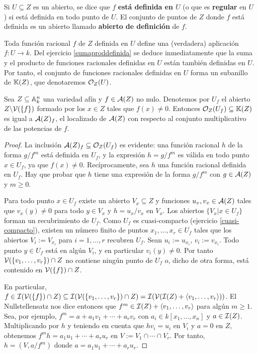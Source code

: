 \documentclass[ACGA.tex]{subfiles}
\begin{document}
 Si $U\subseteq Z$ es un abierto, se dice que $f$ {\bf está definida en $U$} (o que es {\bf regular} en $U$) si está definida en todo punto de $U$. El conjunto de puntos de $Z$ donde $f$ está definida es un abierto llamado {\bf abierto de definición} de $f$. 


Toda función racional $f$ de $Z$ definida en $U$ define una (verdadera) aplicación $f:U\to k$. Del ejercicio \ref{sumaproddefinida} se deduce inmediatamente que la suma y el producto de funciones racionales definidas en $U$ están también definidas en $U$. Por tanto, el conjunto de funciones racionales definidas en $U$ forma un subanillo de $\mathbb{K}(Z)$, que denotaremos ${\mathcal O}_Z(U)$.

\begin{prop}
 Sea $Z\subseteq\mathbb{A}^n_k$ una variedad afín y $f\in{\mathcal A}(Z)$ no nulo. Denotemos por $U_f$ el abierto $Z\backslash \mathcal{V}(\{f\})$ formado por los $x\in Z$ tales que $f(x)\neq 0$. Entonces ${\mathcal O}_Z(U_f)\subseteq\mathbb{K}(Z)$ es igual a ${\mathcal A}(Z)_f$, el localizado de ${\mathcal A}(Z)$ con respecto al conjunto multiplicativo de las potencias de $f$.
\end{prop}

\begin{proof}
 La inclusión ${\mathcal A}(Z)_f\subseteq{\mathcal O}_Z(U_f)$ es evidente: una función racional $h$ de la forma $g/f^m$ está definida en $U_f$, y la expresión $h=g/f^m$ es válida en todo punto $x\in U_f$, ya que $f(x)\neq 0$. Recíprocamente, sea $h$ una función racional definida en $U_f$. Hay que probar que $h$ tiene una expresión de la forma $g/f^m$ con $g\in{\mathcal A}(Z)$ y $m\geq 0$.

Para todo punto $x\in U_f$ existe un abierto $V_x\subseteq Z$ y funciones $u_x,v_x\in{\mathcal A}(Z)$ tales que $v_x(y)\neq 0$ para todo $y\in V_x$ y $h=u_x/v_x$ en $V_x$. Los abiertos $\{V_x|x\in U_f\}$ forman un recubrimiento de $U_f$. Como $U_f$ es cuasi-compacto (ejercicio \ref{cuasi-compacto}), existen un número finito de puntos $x_1,\ldots,x_r\in U_f$ tales que los abiertos $V_i:=V_{x_i}$ para $i=1,\ldots,r$ recubren $U_f$. Sean $u_i:=u_{x_i}$, $v_i:=v_{x_i}$. Todo punto $y\in U_f$ está en algún $V_i$, y en particular $v_i(y)\neq 0$. Por tanto $\mathcal{V}(\{v_1,\ldots,v_r\})\cap Z$ no contiene ningún punto de $U_f$ o, dicho de otra forma, está contenido en $\mathcal{V}(\{f\})\cap Z$. 

 En particular, $f\in\mathcal{I}(\mathcal{V}(\{f\})\cap Z)\subseteq\mathcal{I}(\mathcal{V}(\{v_1,\ldots,v_r\})\cap Z)=\mathcal{I}(\mathcal{V}(\mathcal{I}(Z)+\langle v_1,\ldots,v_r\rangle))$. El Nullstellensatz nos dice entonces que $f^m\in\mathcal{I}(Z)+\langle v_1,\ldots,v_r\rangle$ para algún $m\geq 1$. Sea, por ejemplo, $f^m=a+a_1v_1+\cdots+a_rv_r$ con $a_i\in k[x_1,\ldots,x_n]$ y $a\in\mathcal{I}(Z)$. Multiplicando por $h$ y teniendo en cuenta que $hv_i=u_i$ en $V_i$ y $a=0$ en $Z$, obtenemos $f^mh=a_1u_1+\cdots+a_ru_r$ en $V:=V_1\cap\cdots\cap V_r$. Por tanto, $h=(V,a/f^m)$ donde $a=a_1u_1+\cdots+a_ru_r$.
\end{proof}
\end{document}
